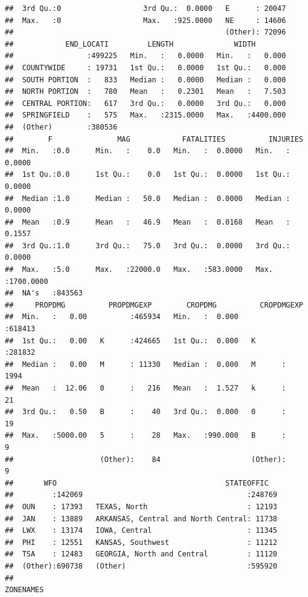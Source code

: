 \documentclass[]{article}
\begin{document}
\begin{verbatim}
##  3rd Qu.:0                   3rd Qu.:  0.0000   E      : 20047  
##  Max.   :0                   Max.   :925.0000   NE     : 14606  
##                                                 (Other): 72096  
##            END_LOCATI         LENGTH              WIDTH         
##                 :499225   Min.   :   0.0000   Min.   :   0.000  
##  COUNTYWIDE     : 19731   1st Qu.:   0.0000   1st Qu.:   0.000  
##  SOUTH PORTION  :   833   Median :   0.0000   Median :   0.000  
##  NORTH PORTION  :   780   Mean   :   0.2301   Mean   :   7.503  
##  CENTRAL PORTION:   617   3rd Qu.:   0.0000   3rd Qu.:   0.000  
##  SPRINGFIELD    :   575   Max.   :2315.0000   Max.   :4400.000  
##  (Other)        :380536                                         
##        F               MAG            FATALITIES          INJURIES        
##  Min.   :0.0      Min.   :    0.0   Min.   :  0.0000   Min.   :   0.0000  
##  1st Qu.:0.0      1st Qu.:    0.0   1st Qu.:  0.0000   1st Qu.:   0.0000  
##  Median :1.0      Median :   50.0   Median :  0.0000   Median :   0.0000  
##  Mean   :0.9      Mean   :   46.9   Mean   :  0.0168   Mean   :   0.1557  
##  3rd Qu.:1.0      3rd Qu.:   75.0   3rd Qu.:  0.0000   3rd Qu.:   0.0000  
##  Max.   :5.0      Max.   :22000.0   Max.   :583.0000   Max.   :1700.0000  
##  NA's   :843563                                                           
##     PROPDMG          PROPDMGEXP        CROPDMG          CROPDMGEXP    
##  Min.   :   0.00          :465934   Min.   :  0.000          :618413  
##  1st Qu.:   0.00   K      :424665   1st Qu.:  0.000   K      :281832  
##  Median :   0.00   M      : 11330   Median :  0.000   M      :  1994  
##  Mean   :  12.06   0      :   216   Mean   :  1.527   k      :    21  
##  3rd Qu.:   0.50   B      :    40   3rd Qu.:  0.000   0      :    19  
##  Max.   :5000.00   5      :    28   Max.   :990.000   B      :     9  
##                    (Other):    84                     (Other):     9  
##       WFO                                       STATEOFFIC    
##         :142069                                      :248769  
##  OUN    : 17393   TEXAS, North                       : 12193  
##  JAN    : 13889   ARKANSAS, Central and North Central: 11738  
##  LWX    : 13174   IOWA, Central                      : 11345  
##  PHI    : 12551   KANSAS, Southwest                  : 11212  
##  TSA    : 12483   GEORGIA, North and Central         : 11120  
##  (Other):690738   (Other)                            :595920  
##                                                                                                                                                                                                     ZONENAMES     

\end{verbatim}
\end{document}
